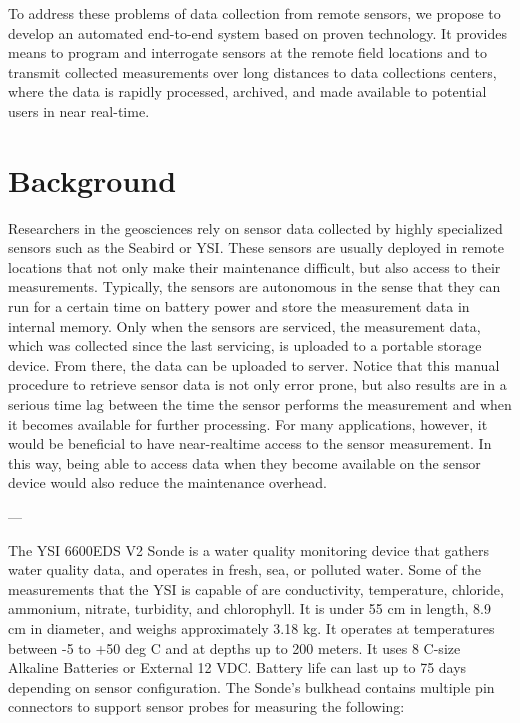 \documentclass[conference]{IEEEtran}
\begin{document}
To address these problems of data collection from remote
sensors, we propose to develop an automated end-to-end system based on
proven technology. It provides means to program and interrogate
sensors at the remote field locations and to transmit collected
measurements over long distances to data collections centers, where the
data is rapidly processed, archived, and made available to potential
users in near real-time.

\section{Background}
\label{SEC_BACKGROUND}

Researchers in the geosciences rely on sensor data collected by highly
specialized sensors such as the Seabird or YSI. These sensors are
usually deployed in remote locations that not only make their
maintenance difficult, but also access to their measurements.
Typically, the sensors are autonomous in the sense that they can run
for a certain time on battery power and store the measurement data in
internal memory. Only when the sensors are serviced, the measurement
data, which was collected since the last servicing, is uploaded to a 
portable storage device. From there, the data can be uploaded to
server. Notice that this manual procedure to retrieve sensor data is not only
error prone, but also results are in a serious time lag between the time
the sensor performs the measurement and when it becomes available for
further processing. For many applications, however, it would be beneficial to
have near-realtime access to the sensor measurement. In this way, being able 
to access data when they become available on the sensor device would also
reduce the maintenance overhead.

---

The YSI 6600EDS V2 Sonde is a water quality monitoring device that
gathers water quality data, and operates in fresh, sea, or polluted
water. Some of the measurements that the YSI is capable of are
conductivity, temperature, chloride, ammonium, nitrate, turbidity, and
chlorophyll.  It is under 55 cm in length, 8.9 cm in diameter, and
weighs approximately 3.18 kg. It operates at temperatures between -5
to +50 deg C and at depths up to 200 meters.  It uses 8 C-size
Alkaline Batteries or External 12 VDC. Battery life can last up to 75
days depending on sensor configuration. The Sonde's bulkhead contains
multiple pin connectors to support sensor probes for measuring the
following:
\end{document}
